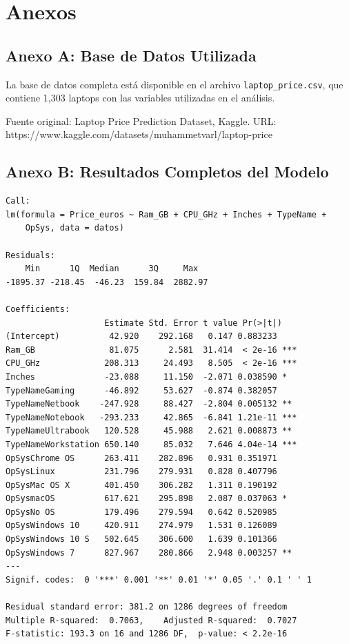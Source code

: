 \documentclass[12pt,a4paper]{article}
\begin{document}
\newpage
\section{Anexos}

\subsection{Anexo A: Base de Datos Utilizada}

La base de datos completa está disponible en el archivo \texttt{laptop\_price.csv}, que contiene 1,303 laptops con las variables utilizadas en el análisis.

Fuente original: Laptop Price Prediction Dataset, Kaggle.
URL: https://www.kaggle.com/datasets/muhammetvarl/laptop-price

\subsection{Anexo B: Resultados Completos del Modelo}

\begin{verbatim}
Call:
lm(formula = Price_euros ~ Ram_GB + CPU_GHz + Inches + TypeName + 
    OpSys, data = datos)

Residuals:
    Min      1Q  Median      3Q     Max 
-1895.37 -218.45  -46.23  159.84  2882.97 

Coefficients:
                    Estimate Std. Error t value Pr(>|t|)    
(Intercept)          42.920    292.168   0.147 0.883233    
Ram_GB               81.075      2.581  31.414  < 2e-16 ***
CPU_GHz             208.313     24.493   8.505  < 2e-16 ***
Inches              -23.088     11.150  -2.071 0.038590 *  
TypeNameGaming      -46.892     53.627  -0.874 0.382057    
TypeNameNetbook    -247.928     88.427  -2.804 0.005132 ** 
TypeNameNotebook   -293.233     42.865  -6.841 1.21e-11 ***
TypeNameUltrabook   120.528     45.988   2.621 0.008873 ** 
TypeNameWorkstation 650.140     85.032   7.646 4.04e-14 ***
OpSysChrome OS      263.411    282.896   0.931 0.351971    
OpSysLinux          231.796    279.931   0.828 0.407796    
OpSysMac OS X       401.450    306.282   1.311 0.190192    
OpSysmacOS          617.621    295.898   2.087 0.037063 *  
OpSysNo OS          179.496    279.594   0.642 0.520985    
OpSysWindows 10     420.911    274.979   1.531 0.126089    
OpSysWindows 10 S   502.645    306.600   1.639 0.101366    
OpSysWindows 7      827.967    280.866   2.948 0.003257 ** 
---
Signif. codes:  0 '***' 0.001 '**' 0.01 '*' 0.05 '.' 0.1 ' ' 1

Residual standard error: 381.2 on 1286 degrees of freedom
Multiple R-squared:  0.7063,    Adjusted R-squared:  0.7027 
F-statistic: 193.3 on 16 and 1286 DF,  p-value: < 2.2e-16
\end{verbatim}
\end{document}
